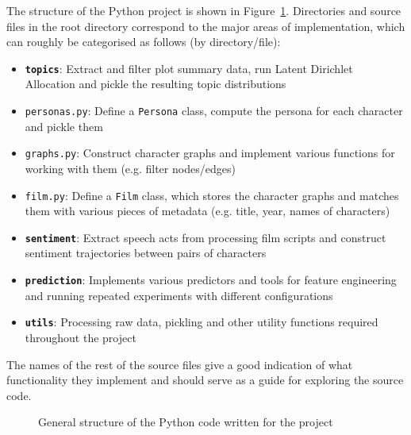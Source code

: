 \documentclass[bsc,frontabs,singlespacing,parskip, twoside]{infthesis}
\begin{document}
The structure of the Python project is shown in Figure~\ref{fig:dirtree}. Directories and source files in the root directory correspond to the major areas of implementation, which can roughly be categorised as follows (by directory/file):
\begin{itemize}
	\item \texttt{\textbf{topics}}:  Extract and filter plot summary data, run Latent Dirichlet Allocation and pickle the resulting topic distributions
	\item \texttt{personas.py}: Define a \texttt{Persona} class, compute the persona for each character and pickle them
	\item \texttt{graphs.py}: Construct character graphs and implement various functions for working with them (e.g. filter nodes/edges)
	\item \texttt{film.py}: Define a \texttt{Film} class, which stores the character graphs and matches them with various pieces of metadata (e.g. title, year, names of characters)
	\item \texttt{\textbf{sentiment}}: Extract speech acts from processing film scripts and construct sentiment trajectories between pairs of characters
	\item \texttt{\textbf{prediction}}: Implements various predictors and tools for feature engineering and running repeated experiments with different configurations
	\item \texttt{\textbf{utils}}: Processing raw data, pickling and other utility functions required throughout the project
\end{itemize}

The names of the rest of the source files give a good indication of what functionality they implement and should serve as a guide for exploring the source code.

\hspace{.1in}
\begin{figure}[ht!]
\caption{General structure of the Python code written for the project}
\label{fig:dirtree}
\end{figure}
\end{document}
